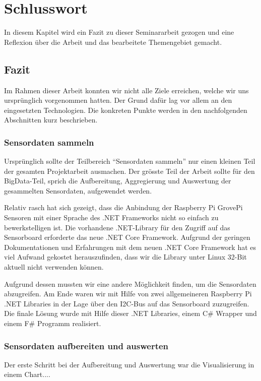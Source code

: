 
\chapter{Schlusswort} \label{chap:Finish}
In diesem Kapitel wird ein Fazit zu dieser Seminararbeit gezogen und eine Reflexion über die Arbeit und das bearbeitete Themengebiet gemacht.

\section{Fazit}
Im Rahmen dieser Arbeit konnten wir nicht alle Ziele erreichen, welche wir uns ursprünglich vorgenommen hatten. Der Grund dafür lag vor allem an den eingesetzten Technologien. Die konkreten Punkte werden in den nachfolgenden Abschnitten kurz beschrieben.

\subsection{Sensordaten sammeln}
Ursprünglich sollte der Teilbereich "`Sensordaten sammeln"' nur einen kleinen Teil der gesamten Projektarbeit ausmachen. Der grösste Teil der Arbeit sollte für den BigData-Teil, sprich die Aufbereitung, Aggregierung und Auswertung der gesammelten Sensordaten, aufgewendet werden. 

Relativ rasch hat sich gezeigt, dass die Anbindung der Raspberry Pi GrovePi Sensoren mit einer Sprache des .NET Frameworks nicht so einfach zu bewerkstelligen ist. Die vorhandene .NET-Library für den Zugriff auf das Sensorboard erforderte das neue .NET Core Framework. Aufgrund der geringen Dokumentationen und Erfahrungen mit dem neuen .NET Core Framework hat es viel Aufwand gekostet herauszufinden, dass wir die Library unter Linux 32-Bit aktuell nicht verwenden können.

Aufgrund dessen mussten wir eine andere Möglichkeit finden, um die Sensordaten abzugreifen. Am Ende waren wir mit Hilfe von zwei allgemeineren Raspberry Pi .NET Libraries in der Lage über den I2C-Bus auf das Sensorboard zuzugreifen. Die finale Lösung wurde mit Hilfe dieser .NET Libraries, einem C\# Wrapper und einem F\# Programm realisiert.

\subsection{Sensordaten aufbereiten und auswerten}
Der erste Schritt bei der Aufbereitung und Auswertung war die Visualisierung in einem Chart....

